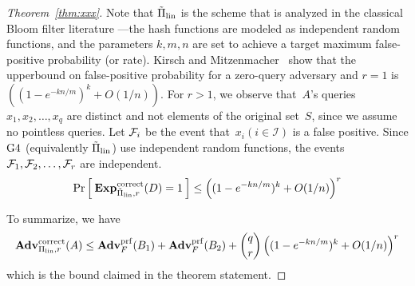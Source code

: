 \begin{proof}[Theorem~\ref{thm:xxx}]
Note that $\tilde{\Pi}_{\mathrm{lin}}$ is the scheme that is analyzed in the classical Bloom filter literature ---the hash functions are modeled as independent random functions, and the parameters $k,m,n$  are set to achieve a target maximum false-positive probability (or rate).  Kirsch and Mitzenmacher~\cite{KM} show that the upperbound on false-positive probability for a zero-query adversary and $r=1$ is $\left( (1-e^{-kn/m})^k + O(1/n) \right)$.  For $r>1$, we observe that~$A$'s queries $x_1,x_2,\ldots,x_q$ are distinct and not elements of the original set~$S$, since we assume no pointless queries. Let ${\cal F}_i$ be the event that~$x_i(i \in \mathcal{I})$ is a false positive.  Since $\text{G4}$ (equivalently $\tilde{\Pi}_{\mathrm{lin}}$) use independent random functions, the events ${\cal F}_1,{\cal F}_2,\ldots,{\cal F}_r$ are independent. 
\[
\Pr\left[\: \mathrm{\mathbf{Exp}}^{\mathrm{correct}}_{\tilde{\Pi}_{\mathrm{lin}},r}(D) = 1 \:\right]\leq \left( (1-e^{-kn/m})^k + O(1/n) \right)^r 
\]

To summarize, we have 
\[
\mathrm{\mathbf{Adv}}^{\mathrm{correct}}_{\Pi_{\mathrm{lin}},r}(A)  \leq  \mathbf{Adv}^{\mathrm{prf}}_{F}(B_1) +\mathbf{Adv}^{\mathrm{prf}}_{F}(B_2) +\dbinom{q}{r}\left( (1-e^{-kn/m})^k + O(1/n) \right)^r
\]
which is the bound claimed in the theorem statement. %


\end{proof}
